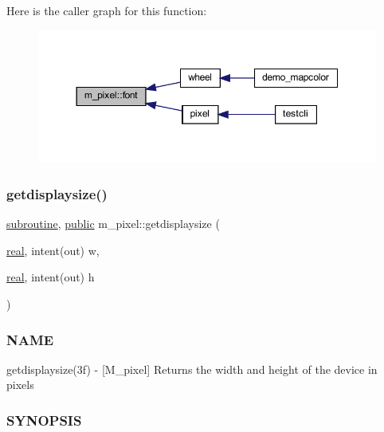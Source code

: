 Here is the caller graph for this function\+:
\nopagebreak
\begin{figure}[H]
\begin{center}
\leavevmode
\includegraphics[width=350pt]{namespacem__pixel_a566adb827a3a26ba42d4e86e4c6e12af_icgraph}
\end{center}
\end{figure}
\mbox{\label{namespacem__pixel_acacbc4462423b9aa0f591cbe7aba4ec6}} 
\subsubsection{\texorpdfstring{getdisplaysize()}{getdisplaysize()}}
{\footnotesize\ttfamily \hyperlink{M__stopwatch_83_8txt_acfbcff50169d691ff02d4a123ed70482}{subroutine}, \hyperlink{M__stopwatch_83_8txt_a2f74811300c361e53b430611a7d1769f}{public} m\+\_\+pixel\+::getdisplaysize (\begin{DoxyParamCaption}\item[{\hyperlink{read__watch_83_8txt_abdb62bde002f38ef75f810d3a905a823}{real}, intent(out)}]{w,  }\item[{\hyperlink{read__watch_83_8txt_abdb62bde002f38ef75f810d3a905a823}{real}, intent(out)}]{h }\end{DoxyParamCaption})}



\subsubsection*{N\+A\+ME}

getdisplaysize(3f) -\/ \mbox{[}M\+\_\+pixel\mbox{]} Returns the width and height of the device in pixels 

\subsubsection*{S\+Y\+N\+O\+P\+S\+IS}

